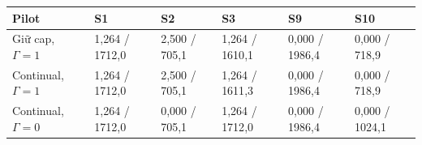 \par\smallskip\noindent\begin{tabularx}{\linewidth}{@{}P{3.6cm}XXXXX@{}}\toprule
\textbf{Pilot} & \textbf{S1} & \textbf{S2} & \textbf{S3} & \textbf{S9} & \textbf{S10} \\
\midrule
Giữ cap, $\Gamma=1$ & 1{,}264 / 1712{,}0 & 2{,}500 / 705{,}1 & 1{,}264 / 1610{,}1 & 0{,}000 / 1986{,}4 & 0{,}000 / 718{,}9 \\
Continual, $\Gamma=1$ & 1{,}264 / 1712{,}0 & 2{,}500 / 705{,}1 & 1{,}264 / 1611{,}3 & 0{,}000 / 1986{,}4 & 0{,}000 / 718{,}9 \\
Continual, $\Gamma=0$ & 1{,}264 / 1712{,}0 & 0{,}000 / 705{,}1 & 1{,}264 / 1712{,}0 & 0{,}000 / 1986{,}4 & 0{,}000 / 1024{,}1 \\
\bottomrule\end{tabularx}\par\smallskip
